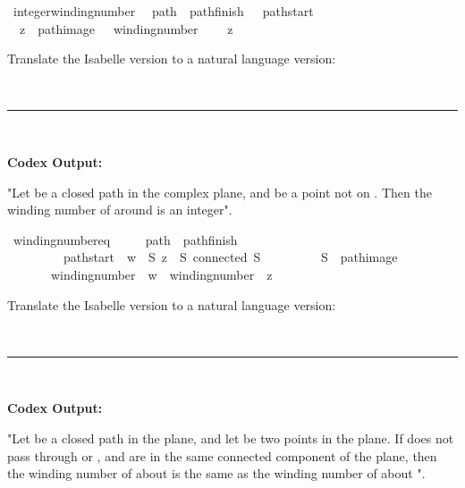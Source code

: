 \documentclass{article}
\begin{document}
\begin{boxB}
\begin{isabelle}
\isamarkupfalse \ integer{\isacharunderscore}{\kern0pt}winding{\isacharunderscore}{\kern0pt}number{\isacharcolon}{\kern0pt}\isanewline
\ \ {\isachardoublequoteopen}{\isasymlbrakk}path\ {\isasymgamma}{\isacharsemicolon}{\kern0pt}\ pathfinish\ {\isasymgamma}\ {\isacharequal}{\kern0pt}\ pathstart\ {\isasymgamma}{\isacharsemicolon}{\kern0pt}\ \isanewline
\ \ z\ {\isasymnotin}\ path{\isacharunderscore}{\kern0pt}image\ {\isasymgamma}{\isasymrbrakk}\ {\isasymLongrightarrow}\ winding{\isacharunderscore}{\kern0pt}number\ \isanewline
\ \ {\isasymgamma}\ z\ {\isasymin}\ {\isasymint}{\isachardoublequoteclose}
\end{isabelle}
Translate the Isabelle version to a natural language version:

\
\hrule
\

\textbf{Codex Output:}

"Let  be a closed path in the complex plane, and  be a point not on . Then the winding number of  around  is an integer".
\end{boxB}

\begin{boxB}
\begin{isabelle}
\isamarkupfalse \ winding{\isacharunderscore}{\kern0pt}number{\isacharunderscore}{\kern0pt}eq{\isacharcolon}{\kern0pt}\isanewline
\ \ \ \ \ {\isachardoublequoteopen}{\isasymlbrakk}path\ {\isasymgamma}{\isacharsemicolon}{\kern0pt}\ pathfinish\ {\isasymgamma}\ \isanewline
\ \ \ \ \ \ \ \ {\isacharequal}{\kern0pt}\ pathstart\ {\isasymgamma}{\isacharsemicolon}{\kern0pt}\ w\ {\isasymin}\ S{\isacharsemicolon}{\kern0pt}\ z\ {\isasymin}\ S{\isacharsemicolon}{\kern0pt}\ connected\ S{\isacharsemicolon}{\kern0pt}\ \isanewline
\ \ \ \ \ \ \ \ S\ {\isasyminter}\ path{\isacharunderscore}{\kern0pt}image\ {\isasymgamma}\ {\isacharequal}{\kern0pt}\ {\isacharbraceleft}{\kern0pt}{\isacharbraceright}{\kern0pt}{\isasymrbrakk}\isanewline
\ \ \ \ \ \ {\isasymLongrightarrow}\ winding{\isacharunderscore}{\kern0pt}number\ {\isasymgamma}\ w\ {\isacharequal}{\kern0pt}\ winding{\isacharunderscore}{\kern0pt}number\ {\isasymgamma}\ z{\isachardoublequoteclose}
\end{isabelle}
Translate the Isabelle version to a natural language version:

\
\hrule
\

\textbf{Codex Output:}

"Let  be a closed path in the plane, and let  be two points in the plane. If  does not pass through  or , and  are in the same connected component of the plane, then the winding number of  about  is the same as the winding number of  about ".
\end{boxB}
\end{document}
